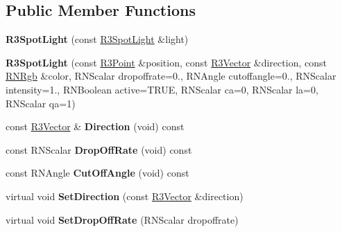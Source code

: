 \subsection*{Public Member Functions}
\begin{DoxyCompactItemize}
\item 
{\bfseries R3\+Spot\+Light} (const \hyperlink{class_r3_spot_light}{R3\+Spot\+Light} \&light)\hypertarget{class_r3_spot_light_a7f96a12fa6966f9ff80f364623739b77}{}\label{class_r3_spot_light_a7f96a12fa6966f9ff80f364623739b77}

\item 
{\bfseries R3\+Spot\+Light} (const \hyperlink{class_r3_point}{R3\+Point} \&position, const \hyperlink{class_r3_vector}{R3\+Vector} \&direction, const \hyperlink{class_r_n_rgb}{R\+N\+Rgb} \&color, R\+N\+Scalar dropoffrate=0., R\+N\+Angle cutoffangle=0., R\+N\+Scalar intensity=1., R\+N\+Boolean active=T\+R\+UE, R\+N\+Scalar ca=0, R\+N\+Scalar la=0, R\+N\+Scalar qa=1)\hypertarget{class_r3_spot_light_a14ff94d1396aa573bf9fd8d71cf18262}{}\label{class_r3_spot_light_a14ff94d1396aa573bf9fd8d71cf18262}

\item 
const \hyperlink{class_r3_vector}{R3\+Vector} \& {\bfseries Direction} (void) const \hypertarget{class_r3_spot_light_a6b0c49b8b45f3ff0b8e0fde98dddd713}{}\label{class_r3_spot_light_a6b0c49b8b45f3ff0b8e0fde98dddd713}

\item 
const R\+N\+Scalar {\bfseries Drop\+Off\+Rate} (void) const \hypertarget{class_r3_spot_light_a248da1cf73c4718eadf1f31fc19698e4}{}\label{class_r3_spot_light_a248da1cf73c4718eadf1f31fc19698e4}

\item 
const R\+N\+Angle {\bfseries Cut\+Off\+Angle} (void) const \hypertarget{class_r3_spot_light_ab95d89e720b6679a2b5b3ee8bcd01341}{}\label{class_r3_spot_light_ab95d89e720b6679a2b5b3ee8bcd01341}

\item 
virtual void {\bfseries Set\+Direction} (const \hyperlink{class_r3_vector}{R3\+Vector} \&direction)\hypertarget{class_r3_spot_light_ae88c52971d49a195f7b4122ff7ec4ef9}{}\label{class_r3_spot_light_ae88c52971d49a195f7b4122ff7ec4ef9}

\item 
virtual void {\bfseries Set\+Drop\+Off\+Rate} (R\+N\+Scalar dropoffrate)\hypertarget{class_r3_spot_light_a2280ba3a723e9994b2d43c704f2ab553}{}\label{class_r3_spot_light_a2280ba3a723e9994b2d43c704f2ab553}


\end{DoxyCompactItemize}
